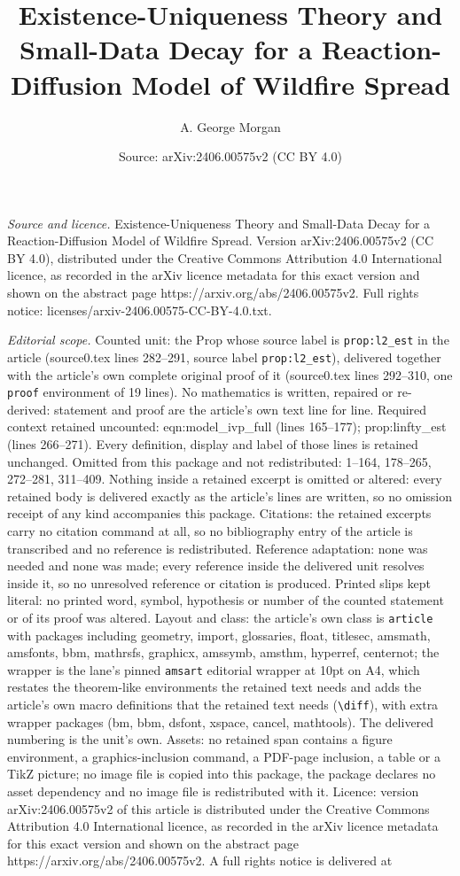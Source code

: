 \documentclass[10pt,a4paper]{amsart}
\title[Existence-Uniqueness Theory and Small-Data Decay for a React]{Existence-Uniqueness Theory and Small-Data Decay for a Reaction-Diffusion Model of Wildfire Spread}
\author{A. George Morgan}
\date{Source: arXiv:2406.00575v2 (CC BY 4.0)}
\begin{document}
\maketitle

\noindent\emph{Source and licence.} Existence-Uniqueness Theory and Small-Data Decay for a Reaction-Diffusion Model of Wildfire Spread. Version arXiv:2406.00575v2 (CC BY 4.0), distributed under the Creative Commons Attribution 4.0 International licence, as recorded in the arXiv licence metadata for this exact version and shown on the abstract page https://arxiv.org/abs/2406.00575v2. Full rights notice: licenses/arxiv-2406.00575-CC-BY-4.0.txt.\par\smallskip

\noindent\textit{Editorial scope.} Counted unit: the Prop whose source label is \texttt{prop:l2\_est} in the article (source0.tex lines 282--291, source label \texttt{prop:l2\_est}), delivered together with the article's own complete original proof of it (source0.tex lines 292--310, one \texttt{proof} environment of 19 lines). No mathematics is written, repaired or re-derived: statement and proof are the article's own text line for line. Required context retained uncounted: eqn:model\_ivp\_full (lines 165--177); prop:linfty\_est (lines 266--271). Every definition, display and label of those lines is retained unchanged. Omitted from this package and not redistributed: 1--164, 178--265, 272--281, 311--409. Nothing inside a retained excerpt is omitted or altered: every retained body is delivered exactly as the article's lines are written, so no omission receipt of any kind accompanies this package. Citations: the retained excerpts carry no citation command at all, so no bibliography entry of the article is transcribed and no reference is redistributed. Reference adaptation: none was needed and none was made; every reference inside the delivered unit resolves inside it, so no unresolved reference or citation is produced. Printed slips kept literal: no printed word, symbol, hypothesis or number of the counted statement or of its proof was altered. Layout and class: the article's own class is \texttt{article} with packages including geometry, import, glossaries, float, titlesec, amsmath, amsfonts, bbm, mathrsfs, graphicx, amssymb, amsthm, hyperref, centernot; the wrapper is the lane's pinned \texttt{amsart} editorial wrapper at 10pt on A4, which restates the theorem-like environments the retained text needs and adds the article's own macro definitions that the retained text needs (\texttt{\textbackslash diff}), with extra wrapper packages (bm, bbm, dsfont, xspace, cancel, mathtools). The delivered numbering is the unit's own. Assets: no retained span contains a figure environment, a graphics-inclusion command, a PDF-page inclusion, a table or a TikZ picture; no image file is copied into this package, the package declares no asset dependency and no image file is redistributed with it. Licence: version arXiv:2406.00575v2 of this article is distributed under the Creative Commons Attribution 4.0 International licence, as recorded in the arXiv licence metadata for this exact version and shown on the abstract page https://arxiv.org/abs/2406.00575v2. A full rights notice is delivered at 
\end{document}
